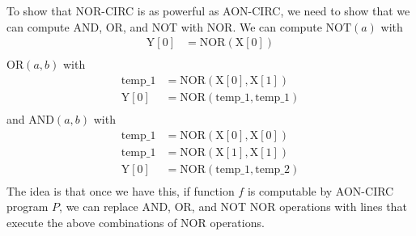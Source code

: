 \documentclass[11pt]{article}
\theoremstyle{definition}
\theoremstyle{remark}
\begin{document}
\begin{enumerate}
\vspace{5pt}
To show that NOR-CIRC is as powerful as AON-CIRC, we need to show that we can compute AND, OR, and NOT with NOR. We can compute $\text{NOT}(a)$ with 
$$\begin{aligned}
\text{Y}[0] &= \text{NOR}(\text{X}[0]) \\
\end{aligned}$$
$\text{OR}(a, b)$ with 
$$\begin{aligned}
\text{temp\_1} &= \text{NOR}(\text{X}[0],\text{X}[1]) \\
\text{Y}[0] &= \text{NOR}(\text{temp\_1}, \text{temp\_1}) \\
\end{aligned}$$
and $\text{AND}(a, b)$ with 
$$\begin{aligned}
\text{temp\_1} &= \text{NOR}(\text{X}[0],\text{X}[0]) \\
\text{temp\_1} &= \text{NOR}(\text{X}[1],\text{X}[1]) \\
\text{Y}[0] &= \text{NOR}(\text{temp\_1}, \text{temp\_2}) \\
\end{aligned}$$
The idea is that once we have this, if function $f$ is computable by AON-CIRC program $P$, we can replace AND, OR, and NOT NOR operations with lines that execute the above combinations of NOR operations.

\end{enumerate}
\end{document}
